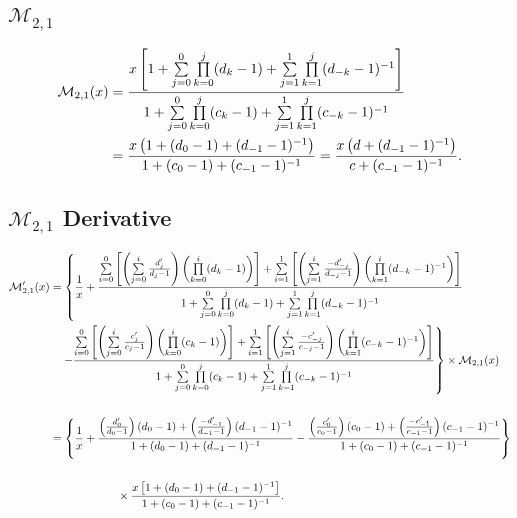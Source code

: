 \documentclass{article}
\begin{document}
\newpage
\subsection{$\mathcal{M}_{2,1}$}
\begin{align*}
    \mathcal{M}_{2,1}(x)&=\frac{x\left[1+\sum\limits_{j=0}^{0}\prod\limits_{k=0}^{j}(d_k-1)+
    \sum\limits_{j=1}^{1}\prod\limits_{k=1}^{j}(d_{-k}-1)^{-1}\right]}{1+
    \sum\limits_{j=0}^{0}\prod\limits_{k=0}^j(c_k-1)+
    \sum_{j=1}^1\limits\prod_{k=1}^{j}\limits(c_{-k}-1)^{-1}}\\
    &=\frac{x\left(1+(d_0-1)+(d_{-1}-1)^{-1}\right)}{1+(c_0-1)+(c_{-1}-1)^{-1}}
    =\frac{x\left(d+(d_{-1}-1)^{-1}\right)}{c+(c_{-1}-1)^{-1}}.
\end{align*}

\subsection{$\mathcal{M}_{2,1}$ Derivative}
\begin{align*}
    \mathcal{M}_{2,1}'(x)&
    =\left\{\frac{1}{x}+
    \frac{\sum_{i=0}^{0}\limits\left[\left(\sum_{j=0}^{i}\limits\frac{d_j'}{d_j-1}\right)
    \left(\prod_{k=0}^{i}\limits(d_k-1)\right)\right]
    +\sum_{i=1}^{1}\limits\left[\left(\sum_{j=1}^{i}\limits\frac{-d_{-j}'}{d_{-j}-1}\right)
    \left(\prod_{k=1}^{i}\limits(d_{-k}-1)^{-1}\right)\right]}{1+\sum\limits_{j=0}^{0}
    \prod\limits_{k=0}^{j}(d_k-1)+
    \sum\limits_{j=1}^{1}\prod\limits_{k=1}^{j}(d_{-k}-1)^{-1}}\right. \\
    &\quad \left. - \frac{\sum_{i=0}^{0}\limits\left[\left(\sum_{j=0}^{i}\limits\frac{c_j'}{c_j-1}\right)
    \left(\prod_{k=0}^{i}\limits(c_k-1)\right)\right]
    +\sum_{i=1}^{1}\limits\left[\left(\sum_{j=1}^{i}\limits\frac{-c_{-j}'}{c_{-j}-1}\right)
    \left(\prod_{k=1}^{i}\limits(c_{-k}-1)^{-1}\right)\right]}{1+
    \sum\limits_{j=0}^{0}\prod\limits_{k=0}^j(c_k-1)+
    \sum_{j=1}^1\limits\prod_{k=1}^{j}\limits(c_{-k}-1)^{-1}}\right\} \times \mathcal{M}_{2,1}(x) \\
    \\
    &=\left\{\frac{1}{x}+
    \frac{\left(\frac{d_0'}{d_0-1}\right)
    \left(d_0-1\right)
    +\left(\frac{-d_{-1}'}{d_{-1}-1}\right)
    (d_{-1}-1)^{-1}}{1+
    (d_0-1)+
    (d_{-1}-1)^{-1}}- \frac{\left(\frac{c_0'}{c_0-1}\right)
    (c_0-1)
    +\left(\frac{-c_{-1}'}{c_{-1}-1}\right)
    (c_{-1}-1)^{-1}}{1+
    (c_0-1)+
    (c_{-1}-1)^{-1}}\right\} \\
    \\
    &\qquad\qquad\qquad \times \frac{x\left[1+(d_0-1)+
    (d_{-1}-1)^{-1}\right]}{1+
    (c_0-1)+
    (c_{-1}-1)^{-1}}.
\end{align*}
\end{document}
